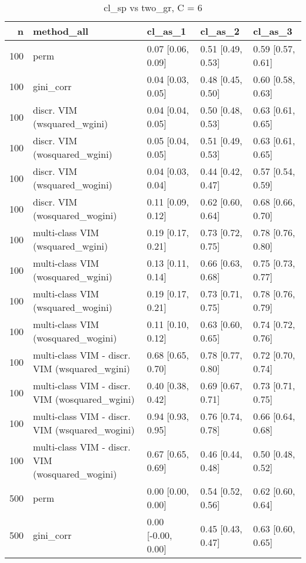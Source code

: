 \begin{table}[ht]
\centering
\caption{cl\_sp vs two\_gr, C = 6} 
\begin{tabular}{rllll}
  \hline
n & method\_all & cl\_as\_1 & cl\_as\_2 & cl\_as\_3 \\ 
  \hline
100 & perm & 0.07 [0.06, 0.09] & 0.51 [0.49, 0.53] & 0.59 [0.57, 0.61] \\ 
  100 & gini\_corr & 0.04 [0.03, 0.05] & 0.48 [0.45, 0.50] & 0.60 [0.58, 0.63] \\ 
  100 & discr. VIM (wsquared\_wgini) & 0.04 [0.04, 0.05] & 0.50 [0.48, 0.53] & 0.63 [0.61, 0.65] \\ 
  100 & discr. VIM (wosquared\_wgini) & 0.05 [0.04, 0.05] & 0.51 [0.49, 0.53] & 0.63 [0.61, 0.65] \\ 
  100 & discr. VIM (wsquared\_wogini) & 0.04 [0.03, 0.04] & 0.44 [0.42, 0.47] & 0.57 [0.54, 0.59] \\ 
  100 & discr. VIM (wosquared\_wogini) & 0.11 [0.09, 0.12] & 0.62 [0.60, 0.64] & 0.68 [0.66, 0.70] \\ 
  100 & multi-class VIM (wsquared\_wgini) & 0.19 [0.17, 0.21] & 0.73 [0.72, 0.75] & 0.78 [0.76, 0.80] \\ 
  100 & multi-class VIM (wosquared\_wgini) & 0.13 [0.11, 0.14] & 0.66 [0.63, 0.68] & 0.75 [0.73, 0.77] \\ 
  100 & multi-class VIM (wsquared\_wogini) & 0.19 [0.17, 0.21] & 0.73 [0.71, 0.75] & 0.78 [0.76, 0.79] \\ 
  100 & multi-class VIM (wosquared\_wogini) & 0.11 [0.10, 0.12] & 0.63 [0.60, 0.65] & 0.74 [0.72, 0.76] \\ 
  100 & multi-class VIM - discr. VIM (wsquared\_wgini) & 0.68 [0.65, 0.70] & 0.78 [0.77, 0.80] & 0.72 [0.70, 0.74] \\ 
  100 & multi-class VIM - discr. VIM (wosquared\_wgini) & 0.40 [0.38, 0.42] & 0.69 [0.67, 0.71] & 0.73 [0.71, 0.75] \\ 
  100 & multi-class VIM - discr. VIM (wsquared\_wogini) & 0.94 [0.93, 0.95] & 0.76 [0.74, 0.78] & 0.66 [0.64, 0.68] \\ 
  100 & multi-class VIM - discr. VIM (wosquared\_wogini) & 0.67 [0.65, 0.69] & 0.46 [0.44, 0.48] & 0.50 [0.48, 0.52] \\ 
   \hline 500 & perm & 0.00 [0.00, 0.00] & 0.54 [0.52, 0.56] & 0.62 [0.60, 0.64] \\ 
  500 & gini\_corr & 0.00 [-0.00, 0.00] & 0.45 [0.43, 0.47] & 0.63 [0.60, 0.65] \\ 

\end{tabular}
\end{table}
